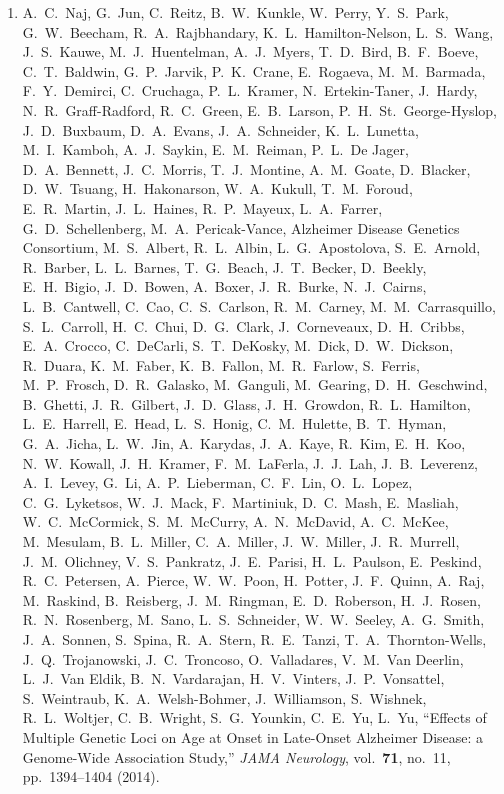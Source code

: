\begin{enumerate}
\item A.\ C.\ Naj, G.\ Jun, C.\ Reitz, B.\ W.\ Kunkle, W.\ Perry, Y.\ S.\ Park, G.\ W.\ Beecham, R.\ A.\ Rajbhandary, K.\ L.\ Hamilton-Nelson, L.\ S.\ Wang, J.\ S.\ Kauwe, M.\ J.\ Huentelman, A.\ J.\ Myers, T.\ D.\ Bird, B.\ F.\ Boeve, C.\ T.\ Baldwin, G.\ P.\ Jarvik, P.\ K.\ Crane, E.\ Rogaeva, M.\ M.\ Barmada, F.\ Y.\ Demirci, C.\ Cruchaga, P.\ L.\ Kramer, N.\ Ertekin-Taner, J.\ Hardy, N.\ R.\ Graff-Radford, R.\ C.\ Green, E.\ B.\ Larson, P.\ H.\ St.\ George-Hyslop, J.\ D.\ Buxbaum, D.\ A.\ Evans, J.\ A.\ Schneider, K.\ L.\ Lunetta, M.\ I.\ Kamboh, A.\ J.\ Saykin, E.\ M.\ Reiman, P.\ L.\ De Jager, D.\ A.\ Bennett, J.\ C.\ Morris, T.\ J.\ Montine, A.\ M.\ Goate, D.\ Blacker, D.\ W.\ Tsuang, H.\ Hakonarson, W.\ A.\ Kukull, T.\ M.\ Foroud, E.\ R.\ Martin, J.\ L.\ Haines, R.\ P.\ Mayeux, L.\ A.\ Farrer, G.\ D.\ Schellenberg, M.\ A.\ Pericak-Vance, Alzheimer Disease Genetics Consortium, M.\ S.\ Albert, R.\ L.\ Albin, L.\ G.\ Apostolova, S.\ E.\ Arnold, R.\ Barber, L.\ L.\ Barnes, T.\ G.\ Beach, J.\ T.\ Becker, D.\ Beekly, E.\ H.\ Bigio, J.\ D.\ Bowen, A.\ Boxer, J.\ R.\ Burke, N.\ J.\ Cairns, L.\ B.\ Cantwell, C.\ Cao, C.\ S.\ Carlson, R.\ M.\ Carney, M.\ M.\ Carrasquillo, S.\ L.\ Carroll, H.\ C.\ Chui, D.\ G.\ Clark, J.\ Corneveaux, D.\ H.\ Cribbs, E.\ A.\ Crocco, C.\ DeCarli, S.\ T.\ DeKosky, M.\ Dick, D.\ W.\ Dickson, R.\ Duara, K.\ M.\ Faber, K.\ B.\ Fallon, M.\ R.\ Farlow, S.\ Ferris, M.\ P.\ Frosch, D.\ R.\ Galasko, M.\ Ganguli, M.\ Gearing, D.\ H.\ Geschwind, B.\ Ghetti, J.\ R.\ Gilbert, J.\ D.\ Glass, J.\ H.\ Growdon, R.\ L.\ Hamilton, L.\ E.\ Harrell, E.\ Head, L.\ S.\ Honig, C.\ M.\ Hulette, B.\ T.\ Hyman, G.\ A.\ Jicha, L.\ W.\ Jin, A.\ Karydas, J.\ A.\ Kaye, R.\ Kim, E.\ H.\ Koo, N.\ W.\ Kowall, J.\ H.\ Kramer, F.\ M.\ LaFerla, J.\ J.\ Lah, J.\ B.\ Leverenz, A.\ I.\ Levey, G.\ Li, A.\ P.\ Lieberman, C.\ F.\ Lin, O.\ L.\ Lopez, C.\ G.\ Lyketsos, W.\ J.\ Mack, F.\ Martiniuk, D.\ C.\ Mash, E.\ Masliah, W.\ C.\ McCormick, S.\ M.\ McCurry, A.\ N.\ McDavid, A.\ C.\ McKee, M.\ Mesulam, B.\ L.\ Miller, C.\ A.\ Miller, J.\ W.\ Miller, J.\ R.\ Murrell, J.\ M.\ Olichney, V.\ S.\ Pankratz, J.\ E.\ Parisi, H.\ L.\ Paulson, E.\ Peskind, R.\ C.\ Petersen, A.\ Pierce, W.\ W.\ Poon, H.\ Potter, J.\ F.\ Quinn, A.\ Raj, M.\ Raskind, B.\ Reisberg, J.\ M.\ Ringman, E.\ D.\ Roberson, H.\ J.\ Rosen, R.\ N.\ Rosenberg, M.\ Sano, L.\ S.\ Schneider, W.\ W.\ Seeley, A.\ G.\ Smith, J.\ A.\ Sonnen, S.\ Spina, R.\ A.\ Stern, R.\ E.\ Tanzi, T.\ A.\ Thornton-Wells, J.\ Q.\ Trojanowski, J.\ C.\ Troncoso, O.\ Valladares, V.\ M.\ Van Deerlin, L.\ J.\ Van Eldik, B.\ N.\ Vardarajan, H.\ V.\ Vinters, J.\ P.\ Vonsattel, S.\ Weintraub, K.\ A.\ Welsh-Bohmer, J.\ Williamson, S.\ Wishnek, R.\ L.\ Woltjer, C.\ B.\ Wright, S.\ G.\ Younkin, C.\ E.\ Yu, L.\ Yu, ``Effects of Multiple Genetic Loci on Age at Onset in Late-Onset Alzheimer Disease: a Genome-Wide Association Study,'' \textit{JAMA Neurology}, vol.\ \textbf{71}, no.\ 11, pp.\ 1394--1404 (2014).


\end{enumerate}
